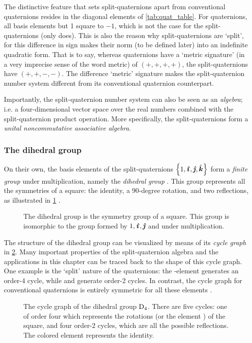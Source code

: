 The distinctive feature that sets split-quaternions apart from conventional quaternions resides in the diagonal elements of \cref{tab:quat_table}. For quaternions, all basis elements but 1 square to \(-1\), which is not the case for the split-quaternions (only \quati does). This is also the reason why split-quaternions are `split', for this difference in sign makes their norm (to be defined later) into an indefinite quadratic form. That is to say, whereas quaternions have a `metric signature' (in a very imprecise sense of the word metric) of \((+, +, +, +)\), the split-quaternions have \((+, +, -, -)\). The difference `metric' signature makes the split-quaternion number system different from its conventional quaternion counterpart.

Importantly, the split-quaternion number system can also be seen as an \emph{algebra}; i.e. a four-dimensional vector space over the real numbers combined with the split-quaternion product operation. More specifically, the split-quaternions form a \emph{unital noncommutative associative algebra}.

\subsubsection{The dihedral group} 
On their own, the basis elements of the split-quaternions \(\qty{1, \quati, \quatj, \quatk}\) form a \emph{finite group} under multiplication, namely the \emph{dihedral group} . This group represents all the symmetries of a square: the identity, a 90-degree rotation, and two reflections, as illustrated in \cref{fig:square_symmetry} \cite{Dummit2004}.
\begin{figure}[ht!]
    \centering
    
    \caption{The dihedral group  is the symmetry group of a square. This group is isomorphic to the group formed by \(1, \quati, \quatj\) and \quatk under multiplication.}
    \label{fig:square_symmetry}
\end{figure}

The structure of the dihedral group can be visualized by means of its \emph{cycle graph} in \cref{fig:cycle_graph}. Many important properties of the split-quaternion algebra and the applications in this chapter can be traced back to the shape of this cycle graph. One example is the `split' nature of the quaternions: the \quati-element generates an order-4 cycle, while \quatj and \quatk generate order-2 cycles. In contrast, the cycle graph for conventional quaternions is entirely symmetric for all these elements \cite{Dummit2004}.
\begin{figure}[h!]
    \centering
    
    \caption{The cycle graph of the dihedral group $\mathrm{D}_4$. There are five cycles: one of order four which represents the rotations (or the element \quati) of the square, and four order-2 cycles, which are all the possible reflections. The colored element represents the identity.}
    \label{fig:cycle_graph}
\end{figure}

